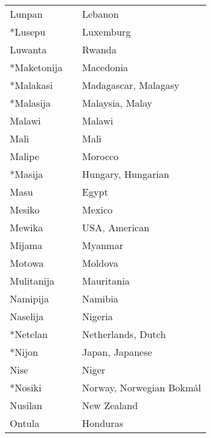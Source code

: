 \begin{supertabular}{p{4,5cm}|ll}
    Lunpan                     &  & Lebanon                         \\
    *Lusepu                    &  & Luxemburg                       \\
    Luwanta                    &  & Rwanda                          \\
    *Maketonija                &  & Macedonia                       \\
    *Malakasi                  &  & Madagascar, Malagasy            \\
    *Malasija                  &  & Malaysia, Malay                 \\
    Malawi                     &  & Malawi                          \\
    Mali                       &  & Mali                            \\
    Malipe                     &  & Morocco                         \\
    *Masija                    &  & Hungary, Hungarian              \\
    Masu                       &  & Egypt                           \\
    Mesiko                     &  & Mexico                          \\
    Mewika                     &  & USA, American                   \\
    Mijama                     &  & Myanmar                         \\
    Motowa                     &  & Moldova                         \\
    Mulitanija                 &  & Mauritania                      \\
    Namipija                   &  & Namibia                         \\
    Naselija                   &  & Nigeria                         \\
    *Netelan                   &  & Netherlands, Dutch              \\
    *Nijon                     &  & Japan, Japanese                 \\
    Nise                       &  & Niger                           \\
    *Nosiki                    &  & Norway, Norwegian Bokmål        \\
    Nusilan                    &  & New Zealand                     \\
    Ontula                     &  & Honduras                        \\

\end{supertabular}
